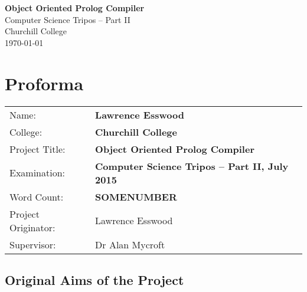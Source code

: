 \documentclass[12pt,a4paper,twoside,openright]{report}
\begin{document}
\EnableBpAbbreviations
\makeatletter \renewcommand{\@cite}[1]{\textsuperscript{\,[#1]}} \makeatother





\pagestyle{empty}


\vspace*{60mm}
\begin{center}
\Huge
\textbf{Object Oriented Prolog Compiler} \\[5mm]
Computer Science Tripos -- Part II \\[5mm]
Churchill College \\[5mm]
\today  %
\end{center}



\pagestyle{plain}

\chapter*{Proforma}

{\large
\begin{tabular}{ll}
Name:               & \bf Lawrence Esswood                       \\
College:            & \bf Churchill College                     \\
Project Title:      & \bf Object Oriented Prolog Compiler \\
Examination:        & \bf Computer Science Tripos -- Part II, July 2015  \\
Word Count:         & \bf SOMENUMBER \\
Project Originator: & Lawrence Esswood                    \\
Supervisor:         & Dr Alan Mycroft                    \\ 
\end{tabular}
}


\section*{Original Aims of the Project}
\end{document}
